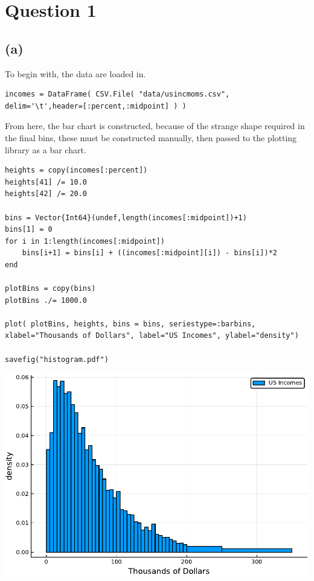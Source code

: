 \documentclass[12pt]{paper}
\begin{document}
\section{Question 1}

\subsection{(a)}


To begin with, the data are loaded in.

\begin{verbatim}
incomes = DataFrame( CSV.File( "data/usincmoms.csv", delim='\t',header=[:percent,:midpoint] ) )
\end{verbatim}



From here, the bar chart is constructed, because of the strange shape
required in the final bins, these must be constructed manually, then
passed to the plotting library as a bar chart.



\begin{verbatim}
heights = copy(incomes[:percent])
heights[41] /= 10.0
heights[42] /= 20.0

bins = Vector{Int64}(undef,length(incomes[:midpoint])+1)
bins[1] = 0
for i in 1:length(incomes[:midpoint])
    bins[i+1] = bins[i] + ((incomes[:midpoint][i]) - bins[i])*2
end

plotBins = copy(bins)
plotBins ./= 1000.0

plot( plotBins, heights, bins = bins, seriestype=:barbins, xlabel="Thousands of Dollars", label="US Incomes", ylabel="density")

savefig("histogram.pdf")
\end{verbatim}

\begin{centering}
  \includegraphics{histogram.pdf}
\end{centering}
\end{document}
